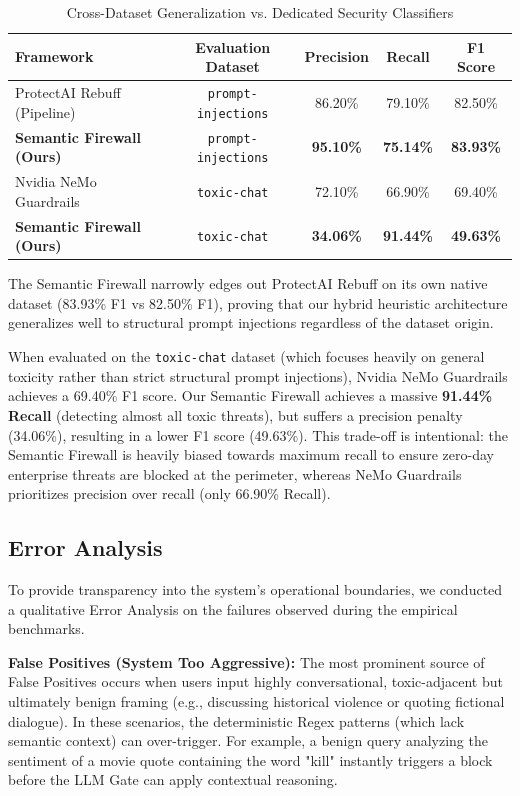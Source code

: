 \documentclass[12pt,a4paper]{article}
\begin{document}
\begin{table}[H]
\centering
\caption{Cross-Dataset Generalization vs. Dedicated Security Classifiers}
\label{tab:dedicated-classifiers}
\begin{tabular}{@{}lcccc@{}}
\toprule
\textbf{Framework} & \textbf{Evaluation Dataset} & \textbf{Precision} & \textbf{Recall} & \textbf{F1 Score} \\
\midrule
ProtectAI Rebuff (Pipeline) & \texttt{prompt-injections} & 86.20\% & 79.10\% & 82.50\% \\
\textbf{Semantic Firewall (Ours)} & \texttt{prompt-injections} & \textbf{95.10\%} & \textbf{75.14\%} & \textbf{83.93\%} \\
\midrule
Nvidia NeMo Guardrails & \texttt{toxic-chat} & 72.10\% & 66.90\% & 69.40\% \\
\textbf{Semantic Firewall (Ours)} & \texttt{toxic-chat} & \textbf{34.06\%} & \textbf{91.44\%} & \textbf{49.63\%} \\
\bottomrule
\end{tabular}
\end{table}

The Semantic Firewall narrowly edges out ProtectAI Rebuff on its own native dataset (83.93\% F1 vs 82.50\% F1), proving that our hybrid heuristic architecture generalizes well to structural prompt injections regardless of the dataset origin. 

When evaluated on the \texttt{toxic-chat} dataset (which focuses heavily on general toxicity rather than strict structural prompt injections), Nvidia NeMo Guardrails achieves a 69.40\% F1 score. Our Semantic Firewall achieves a massive \textbf{91.44\% Recall} (detecting almost all toxic threats), but suffers a precision penalty (34.06\%), resulting in a lower F1 score (49.63\%). This trade-off is intentional: the Semantic Firewall is heavily biased towards maximum recall to ensure zero-day enterprise threats are blocked at the perimeter, whereas NeMo Guardrails prioritizes precision over recall (only 66.90\% Recall).

\subsection{Error Analysis}

To provide transparency into the system's operational boundaries, we conducted a qualitative Error Analysis on the failures observed during the empirical benchmarks. 

\textbf{False Positives (System Too Aggressive):}
The most prominent source of False Positives occurs when users input highly conversational, toxic-adjacent but ultimately benign framing (e.g., discussing historical violence or quoting fictional dialogue). In these scenarios, the deterministic Regex patterns (which lack semantic context) can over-trigger. For example, a benign query analyzing the sentiment of a movie quote containing the word "kill" instantly triggers a block before the LLM Gate can apply contextual reasoning.
\end{document}
